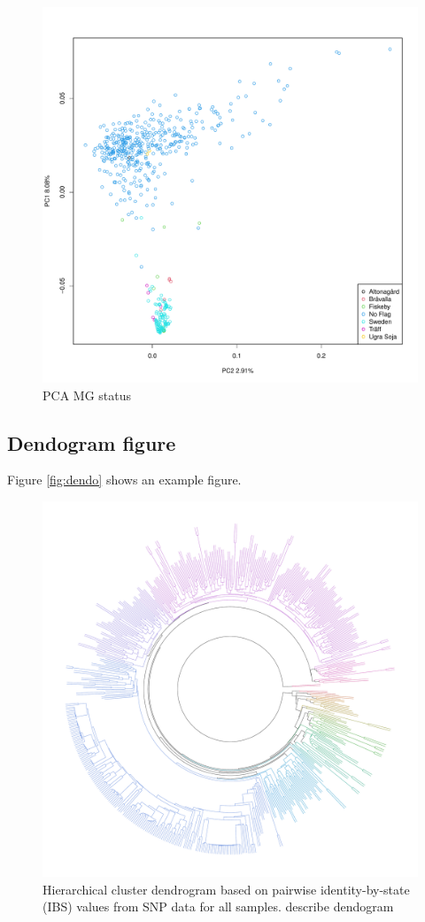 \documentclass[9pt, onecolumn,twoside]{gsajnl}
\begin{document}
\begin{figure}[t]
\centering
\includegraphics[width=\linewidth]{plot_PCA_flag.pdf}
\caption{PCA MG status}%
\label{fig:pca3}
\end{figure}
\subsection{Dendogram figure}

Figure \ref{fig:dendo} shows an example figure.

\begin{figure}[t]
\centering
\includegraphics[width=\linewidth]{rainbow.pdf}
\caption{Hierarchical cluster dendrogram based on pairwise identity-by-state (IBS) values from SNP data for all samples. describe dendogram}%
\label{fig:pca}
\end{figure}
\end{document}
